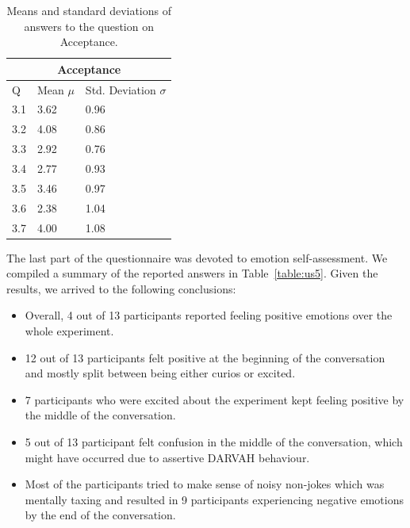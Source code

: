 \begin{table}[htpb]
\centering
    \begin{tabular}{|l|l|l|}
    \hline
    \multicolumn{3}{|c|}{Acceptance} \\ \hline
    Q   & Mean \( \mu\) & Std. Deviation \( \sigma\) \\ \hline
    3.1 & 3.62  & 0.96           \\ \hline
    3.2 & 4.08  & 0.86           \\ \hline
    3.3 & 2.92  & 0.76           \\ \hline
    3.4 & 2.77  & 0.93           \\ \hline
    3.5 & 3.46  & 0.97           \\ \hline
    3.6 & 2.38  & 1.04           \\ \hline
    3.7 & 4.00  & 1.08           \\ \hline
    \end{tabular}
\caption{Means and standard deviations of answers to the question on Acceptance.}
\label{table:us3}
\end{table}

The last part of the questionnaire was devoted to emotion self-assessment. We compiled a summary of the reported answers in Table~\ref{table:us5}. Given the results, we arrived to the following conclusions:
\begin{itemize}
    \item Overall, 4 out of 13 participants reported feeling positive emotions over the whole experiment.
    \item 12 out of 13 participants felt positive at the beginning of the conversation and mostly split between being either curios or excited.  
    \item 7 participants who were excited about the experiment kept feeling positive by the middle of the conversation. 
    \item 5 out of 13 participant felt confusion in the middle of the conversation, which might have occurred due to assertive DARVAH behaviour.
    \item Most of the participants tried to make sense of noisy non-jokes which was mentally taxing and resulted in 9 participants experiencing negative emotions by the end of the conversation.
\end{itemize}

